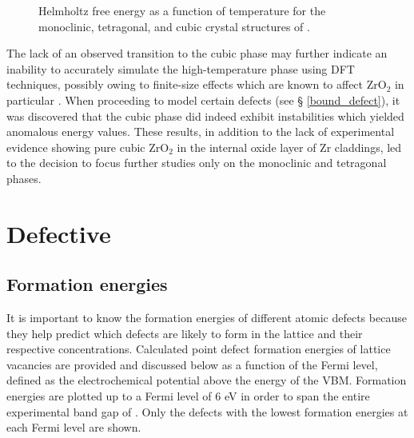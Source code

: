 \begin{figure}[ht] %
\begin{center}
		\caption{Helmholtz free energy as a function of temperature for the monoclinic, tetragonal, and cubic crystal structures of \zirconia .}
		\label{Figure:helmholtz}
	\end{center}
\end{figure}

The lack of an observed transition to the cubic phase may further indicate an inability to accurately simulate the high-temperature phase using DFT techniques, possibly owing to finite-size effects which are known to affect ZrO$_{2}$ in particular \cite{burr2017importance}. When proceeding to model certain defects (see § \ref{bound_defect}), it was discovered that the cubic phase did indeed exhibit instabilities which yielded anomalous energy values. These results, in addition to the lack of experimental evidence showing pure cubic ZrO$_{2}$ in the internal oxide layer of Zr claddings, led to the decision to focus further studies only on the monoclinic and tetragonal phases.

\section{Defective \zirconia} \label{dis_form_energy_intrinsic}

\subsection{Formation energies}

It is important to know the formation energies of different atomic defects because they help predict which defects are likely to form in the lattice and their respective concentrations. Calculated point defect formation energies of lattice vacancies are provided and discussed below as a function of the Fermi level, defined as the electrochemical potential above the energy of the VBM. Formation energies are plotted up to a Fermi level of 6 eV in order to span the entire experimental band gap of \zirconia . Only the defects with the lowest formation energies at each Fermi level are shown.

